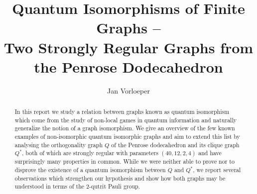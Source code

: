\documentclass[runningheads]{llncs}
\begin{document}
%
\title{Quantum Isomorphisms of Finite Graphs -- \\Two Strongly Regular Graphs from the Penrose Dodecahedron}
%
%
\author{
Jan Vorloeper
}
%
%
%
\maketitle              %
%
\begin{abstract}
In this report we study a relation between graphs known as quantum isomorphism
which come from the study of non-local games in quantum information
and naturally generalize the notion of a graph isomorphism.
%
We give an overview of the few known examples of non-isomorphic
quantum isomorphic graphs and aim to extend this list by analysing 
the orthogonality graph $Q$ of the Penrose dodecahedron and its clique graph $Q^*$,
both of which are strongly regular with parameters $(40, 12, 2, 4)$
and have surprisingly many properties in common.
%
While we were neither able to prove nor to disprove the existence of 
a quantum isomorphism between $Q$ and $Q^*$, we report several
observations which strengthen our hypothesis and show how both graphs 
may be understood in terms of the 2-qutrit Pauli group.

\end{abstract}
%
%
%






%
%
%


%

\end{document}
